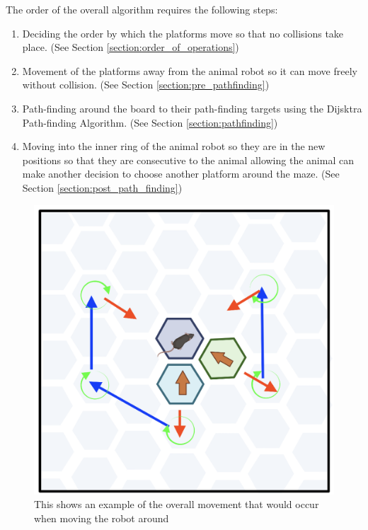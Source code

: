 The order of the overall algorithm requires the following steps:
\begin{tcolorbox}
\begin{enumerate}
    \item Deciding the order by which the platforms move so that no collisions take place. (See  Section \ref{section:order_of_operations})
    \item Movement of the platforms away from the animal robot so it can move freely without collision. (See Section \ref{section:pre_pathfinding})
    \item Path-finding around the board to their path-finding targets using the Dijsktra Path-finding Algorithm. (See Section \ref{section:pathfinding})
    \item Moving into the inner ring of the animal robot so they are in the new positions so that they are consecutive to the animal allowing the animal can make another decision to choose another platform around the maze. (See Section \ref{section:post_path_finding})
\end{enumerate}
\end{tcolorbox}


\begin{figure}[h]
    \centering
    \includegraphics[scale=0.4]{images/overview_of_algorithm.png}
    \caption{This shows an example of the overall movement that would occur when moving the robot around}
    \label{fig:overview_of_algorithm}
\end{figure}

